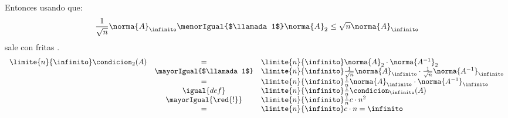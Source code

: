 \begin{enumerate}[label=\alph*)]
        Entonces usando que:
        $$
          \frac{1}{\sqrt{n}} \norma{A}_\infinito \menorIgual{$\llamada1$} \norma{A}_2 \leq \sqrt{n} \norma{A}_\infinito
        $$
        sale con fritas .
        $$
          \begin{array}{rcl}
            \limite{n}{\infinito} \condicion_2(A)
             & =                        &
            \limite{n}{\infinito} \norma{A}_2 \cdot \norma{A^{-1}}_2                                                     \\
             & \mayorIgual{$\llamada1$} &
            \limite{n}{\infinito} \frac{1}{\sqrt{n}}\norma{A}_\infinito \cdot \frac{1}{\sqrt{n}}\norma{A^{-1}}_\infinito \\
             & =                        &
            \limite{n}{\infinito} \frac{1}{n} \norma{A}_\infinito \cdot \norma{A^{-1}}_\infinito                         \\
             & \igual{def}              &
            \limite{n}{\infinito}
            \frac{1}{n} \condicion_\infinito(A)                                                                          \\
             & \mayorIgual{\red{!}}     &
            \limite{n}{\infinito}
            \frac{1}{n} c \cdot n^2                                                                                      \\
             & =                        &
            \limite{n}{\infinito}
            c \cdot n
            = \infinito
          \end{array}
        $$
\end{enumerate}

\begin{aportes}
  \item {}
\end{aportes}
